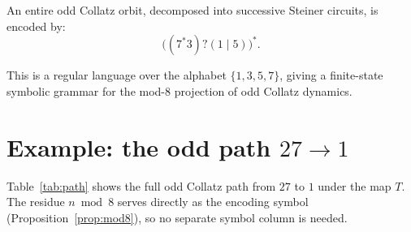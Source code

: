 \documentclass[11pt]{article}
\begin{document}
An entire odd Collatz orbit, decomposed into successive Steiner circuits, is
encoded by:
\[
  \boxed{\bigl((7^*3)?(1 \mid 5)\bigr)^*}.
\]

This is a regular language over the alphabet $\{1, 3, 5, 7\}$, giving a
finite-state symbolic grammar for the mod-8 projection of odd Collatz
dynamics.

\section{Example: the odd path $27 \to 1$}

Table~\ref{tab:path} shows the full odd Collatz path from $27$ to $1$
under the map $T$.  The residue $n\bmod 8$ serves directly as the
encoding symbol (Proposition~\ref{prop:mod8}), so no separate symbol
column is needed.
\end{document}
